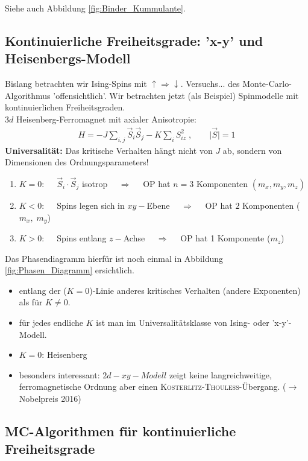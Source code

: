 \documentclass[12pt]{article}
\begin{document}
Siehe auch Abbildung \ref{fig:Binder_Kummulante}.
 \subsection{Kontinuierliche Freiheitsgrade: 'x-y' und Heisenbergs-Modell} \label{Kapitel2.9}
 Bislang betrachten wir Ising-Spins mit $ \uparrow \Rightarrow \downarrow$. Versuchs... %
 des Monte-Carlo-Algorithmus 'offensichtlich'. Wir betrachten jetzt (als Beispiel) Spinmodelle mit kontinuierlichen Freiheitsgraden.\\ 
 $3d$ Heisenberg-Ferromagnet mit axialer Anisotropie: 
 \begin{align}
 H= - J \sum_{i,j} \vec{S}_i \vec{S}_j - K \sum_i S_{iz}^2 \; , \quad \quad  \vert \vec{S} \vert
 =1
 \end{align}
 \textbf{Universalität:} Das kritische Verhalten hängt nicht von $J$ ab, sondern von Dimensionen des Ordnungsparameters!
 \begin{enumerate}
 \item $K= 0:  \quad$ $\vec{S}_i \cdot \vec{S}_j$ isotrop $ \quad \Rightarrow  \quad$ OP hat $n=3$ Komponenten $(m_x, m_y, m_z)$
 \item $K<0:  \quad$ Spins legen sich in $xy-$Ebene $ \quad \Rightarrow  \quad$ OP hat $2$ Komponenten ($m_x, \; m_y$)
 \item $K>0 : \quad$ Spins entlang $z-$Achse $ \quad \Rightarrow  \quad$ OP hat 1 Komponente ($m_z$)
 \end{enumerate}
 Das Phasendiagramm hierfür ist noch einmal in Abbildung \ref{fig:Phasen_Diagramm} ersichtlich.
 \begin{itemize}
 \item entlang der ($K=0$)-Linie anderes kritisches Verhalten (andere Exponenten) als für $K\neq 0$.
 \item für jedes endliche $K$ ist man im Universalitätsklasse von Ising- oder 'x-y'-Modell. 
 \item $K=0$: Heisenberg
 
 \item besonders interessant: $2d-xy-Modell$ zeigt keine langreichweitige, ferromagnetische Ordnung aber einen \textsc{Kosterlitz-Thouless}-Übergang. ($\to$ Nobelpreis 2016) 
\end{itemize}
\subsection{MC-Algorithmen für kontinuierliche Freiheitsgrade}
\end{document}
